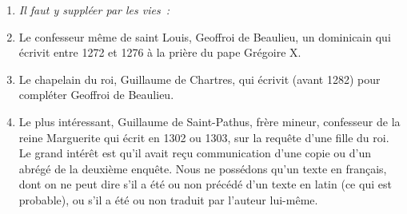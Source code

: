 \documentclass[french,twoside]{book} %
\newlength{\listmod}
\newcommand{\listhead}[1]{\hspace{-1\listmod}\emph{#1}}
\begin{document}
\begin{enumerate}[itemsep=0pt,]
\item[]\listhead{Il faut y suppléer par les vies :}
\item Le confesseur même de saint Louis, Geoffroi de Beaulieu, un dominicain qui écrivit entre 1272 et 1276 à la prière du pape Grégoire X.
\item Le chapelain du roi, Guillaume de Chartres, qui écrivit (avant 1282) pour compléter Geoffroi de Beaulieu.
\item Le plus intéressant, Guillaume de Saint-Pathus, frère mineur, confesseur de la reine Marguerite qui écrit en 1302 ou 1303, sur la requête d’une fille du roi. Le grand intérêt est qu’il avait reçu communication d’une copie ou d’un abrégé de la deuxième enquête. Nous ne possédons qu’un texte en français, dont on ne peut dire s’il a été ou non précédé d’un texte en latin (ce qui est probable), ou s’il a été ou non traduit par l’auteur lui-même.
\end{enumerate}
\end{document}
